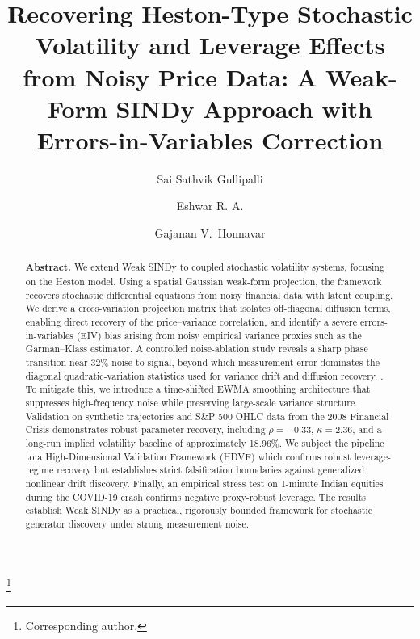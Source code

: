 \documentclass[reprint, amsmath, amssymb, aps, prl, superscriptaddress, nofootinbib]{revtex4-2}
\begin{document}
\title{Recovering Heston-Type Stochastic Volatility and Leverage Effects from Noisy Price Data: A Weak-Form SINDy Approach with Errors-in-Variables Correction}

\author{Sai Sathvik Gullipalli}

\author{Eshwar R. A.}

\author{Gajanan V.\ Honnavar}
\thanks{Corresponding author.}

\begin{abstract}
\vspace{0.5em}
\noindent\textbf{Abstract.}
We extend Weak SINDy to coupled stochastic volatility systems, focusing on the Heston model. Using a spatial Gaussian weak-form projection, the framework recovers stochastic differential equations from noisy financial data with latent coupling. We derive a cross-variation projection matrix that isolates off-diagonal diffusion terms, enabling direct recovery of the price--variance correlation, and identify a severe errors-in-variables (EIV) bias arising from noisy empirical variance proxies such as the Garman--Klass estimator. A controlled noise-ablation study reveals a sharp phase transition near 32\% noise-to-signal, beyond which measurement error dominates the diagonal quadratic-variation statistics used for variance drift and diffusion recovery.
. To mitigate this, we introduce a time-shifted EWMA smoothing architecture that suppresses high-frequency noise while preserving large-scale variance structure. Validation on synthetic trajectories and S\&P 500 OHLC data from the 2008 Financial Crisis demonstrates robust parameter recovery, including $\rho=-0.33$, $\kappa=2.36$, and a long-run implied volatility baseline of approximately 18.96\%. We subject the pipeline to a High-Dimensional Validation Framework (HDVF) which confirms robust leverage-regime recovery but establishes strict falsification boundaries against generalized nonlinear drift discovery. Finally, an empirical stress test on 1-minute Indian equities during the COVID-19 crash confirms negative proxy-robust leverage. The results establish Weak SINDy as a practical, rigorously bounded framework for stochastic generator discovery under strong measurement noise.
 \end{abstract}
\end{document}
